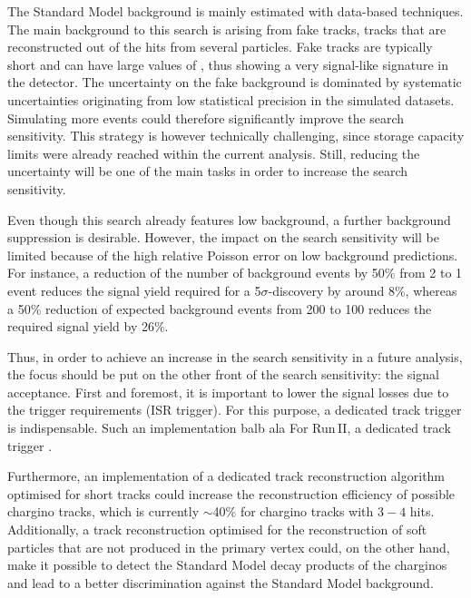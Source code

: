 The Standard Model background is mainly estimated with data-based techniques.
The main background to this search is arising from fake tracks, \ie tracks that are reconstructed out of the hits from several particles.
Fake tracks are typically short and can have large values of \ias, thus showing a very signal-like signature in the detector.
The uncertainty on the fake background is dominated by systematic uncertainties originating from low statistical precision in the simulated datasets.
Simulating more events could therefore significantly improve the search sensitivity.
This strategy is however technically challenging, since storage capacity limits were already reached within the current analysis.
Still, reducing the uncertainty will be one of the main tasks in order to increase the search sensitivity.

Even though this search already features low background, a further background suppression is desirable.
However, the impact on the search sensitivity will be limited because of the high relative Poisson error on low background predictions.
For instance, a reduction of the number of background events by 50\% from 2 to 1 event reduces the signal yield required for a 5$\sigma$-discovery by around 8\%, whereas a 50\% reduction of expected background events from 200 to 100 reduces the required signal yield by 26\%.

Thus, in order to achieve an increase in the search sensitivity in a future analysis, the focus should be put on the other front of the search sensitivity: the signal acceptance.
First and foremost, it is important to lower the signal losses due to the trigger requirements (ISR trigger).
For this purpose, a dedicated track trigger is indispensable.
Such an implementation balb ala
For Run\,II, a dedicated track trigger .

Furthermore, an implementation of a dedicated track reconstruction algorithm optimised for short tracks could increase the reconstruction efficiency of possible chargino tracks, which is currently $\sim$40\% for chargino tracks with $3-4$ hits.
Additionally, a track reconstruction optimised for the reconstruction of soft particles that are not produced in the primary vertex could, on the other hand, make it possible to detect the Standard Model decay products of the charginos and lead to a better discrimination against the Standard Model background.\\


